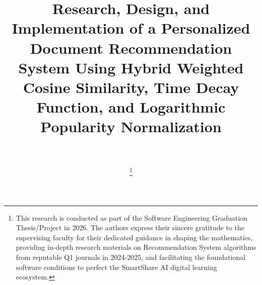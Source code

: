 \documentclass[journal]{IEEEtran}
\begin{document}
\title{Research, Design, and Implementation of a Personalized Document Recommendation System Using Hybrid Weighted Cosine Similarity, Time Decay Function, and Logarithmic Popularity Normalization}

\author{
     \\
    
    \thanks{This research is conducted as part of the Software Engineering Graduation Thesis/Project in 2026. 
    The authors express their sincere gratitude to the supervising faculty for their dedicated guidance in shaping the mathematics, 
    providing in-depth research materials on Recommendation System algorithms from reputable Q1 journals in 2024-2025, 
    and facilitating the foundational software conditions to perfect the SmartShare AI digital learning ecosystem.}
}

\maketitle
\end{document}
